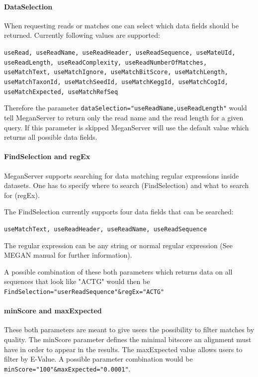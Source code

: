 \documentclass[11pt]{article}
\begin{document}
\paragraph{DataSelection}
\label{subsec:datasel}

When requesting reads or matches one can select which data fields should be returned. Currently following values are supported:


\texttt{useRead, useReadName, useReadHeader, useReadSequence, useMateUId, useReadLength, useReadComplexity, useReadNumberOfMatches, useMatchText, useMatchIgnore, useMatchBitScore, useMatchLength, useMatchTaxonId, useMatchSeedId, useMatchKeggId, useMatchCogId, useMatchExpected, useMatchRefSeq}

Therefore the parameter \texttt{dataSelection="useReadName,useReadLength"} would tell MeganServer to return only the read name and the read length for a given query. If this parameter is skipped MeganServer will use the default value which returns all possible data fields.






\paragraph{FindSelection and regEx}
\label{subsec:findsel}
MeganServer supports searching for data matching regular expressions inside datasets. One has to specify where to search (FindSelection) and what to search for (regEx).

The FindSelection currently supports four data fields that can be searched:

\texttt{useMatchText, useReadHeader, useReadName, useReadSequence}

The regular expression can be any string or normal regular expression (See MEGAN manual for further information).

A possible combination of these both parameters which returns data on all sequences that look like "ACTG" would then be \texttt{FindSelection="userReadSequence"\&regEx="ACTG"}




\paragraph{minScore and maxExpected}
\label{subsec:minScore}
These both parameters are meant to give users the possibility to filter matches by quality. The minScore parameter defines the minimal bitscore an alignment must have in order to appear in the results. The maxExpected value allows users to filter by E-Value. A possible parameter combination would be \texttt{minScore="100"\&maxExpected="0.0001"}.
\end{document}

